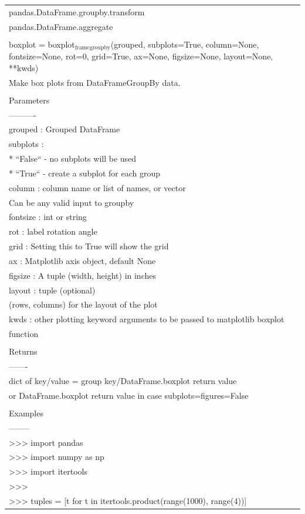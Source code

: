 \documentclass[11pt]{article}
\begin{document}
\begin{enumerate}
\begin{enumerate}
\begin{enumerate}
\begin{center}
\begin{tabular}{l}
pandas.DataFrame.groupby.transform\\
pandas.DataFrame.aggregate\\
\\
boxplot = boxplot\(_{\text{frame}}\)\(_{\text{groupby}}\)(grouped, subplots=True, column=None, fontsize=None, rot=0, grid=True, ax=None, figsize=None, layout=None, **kwds)\\
Make box plots from DataFrameGroupBy data.\\
\\
Parameters\\
----------\\
grouped : Grouped DataFrame\\
subplots :\\
* ``False`` - no subplots will be used\\
* ``True`` - create a subplot for each group\\
column : column name or list of names, or vector\\
Can be any valid input to groupby\\
fontsize : int or string\\
rot : label rotation angle\\
grid : Setting this to True will show the grid\\
ax : Matplotlib axis object, default None\\
figsize : A tuple (width, height) in inches\\
layout : tuple (optional)\\
(rows, columns) for the layout of the plot\\
kwds : other plotting keyword arguments to be passed to matplotlib boxplot\\
function\\
\\
Returns\\
-------\\
dict of key/value = group key/DataFrame.boxplot return value\\
or DataFrame.boxplot return value in case subplots=figures=False\\
\\
Examples\\
--------\\
>>> import pandas\\
>>> import numpy as np\\
>>> import itertools\\
>>>\\
>>> tuples = [t for t in itertools.product(range(1000), range(4))]\\

\end{tabular}
\end{center}
\end{enumerate}
\end{enumerate}
\end{enumerate}
\end{document}
